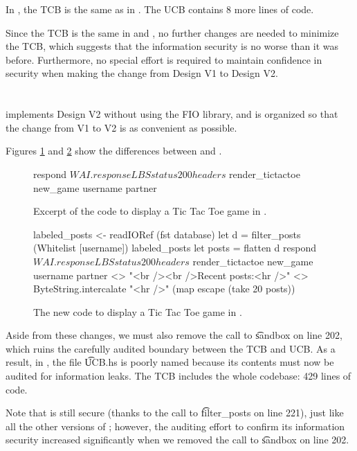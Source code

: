 \begin{refsection}
In \viiF{}, the TCB is the same as in \viF{}.
%
The UCB contains 8 more lines of code.

Since the TCB is the same in \viF{} and \viiF{},
no further changes are needed to minimize the TCB,
which suggests that the information security is no worse than it was before.
%
Furthermore, no special effort is required to maintain confidence in security when making the change from Design V1 to Design V2.

\section{\viiN}

\myapp{} \viiN{} implements Design V2 without using the FIO library,
and is organized so that the change from V1 to V2 is as convenient as possible.

Figures \ref{code_tictactoe_viN} and \ref{code_tictactoe_viiN} show the differences between \viN{} and \viiN{}.
\begin{figure}
\begin{fb}
respond $ WAI.responseLBS status200 headers $
    render_tictactoe new_game username partner
\end{fb}
\caption{Excerpt of the code to display a Tic Tac Toe game in \viN{}.}
\label{code_tictactoe_viN}
\end{figure}
\begin{figure}
\begin{fb}
labeled_posts <- readIORef (fst database)
let d = filter_posts (Whitelist [username]) labeled_posts
let posts = flatten d
respond $ WAI.responseLBS status200 headers $
    render_tictactoe new_game username partner <>
    "<br /><br />Recent posts:<hr />" <>
    ByteString.intercalate "<hr />" (map escape (take 20 posts))
\end{fb}
\caption{The new code to display a Tic Tac Toe game in \viiN{}.}
\label{code_tictactoe_viiN}
\end{figure}
Aside from these changes,
we must also remove the call to \t{sandbox} on line 202,
which ruins the carefully audited boundary between the TCB and UCB.
%
As a result, in \viiN{}, the file \t{UCB.hs} is poorly named because its contents must now be audited for information leaks.
%
The TCB includes the whole codebase: 429 lines of code.

Note that \viiN{} is still secure (thanks to the call to \t{filter\_posts} on line 221),
just like all the other versions of \myapp{};
however, the auditing effort to confirm its information security increased significantly when we removed the call to \t{sandbox} on line 202.


\end{refsection}
